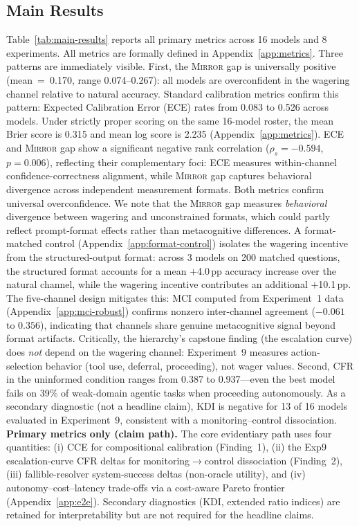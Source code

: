 \documentclass[10pt]{article}
\newcommand{\mirror}{\textsc{Mirror}}
\newcommand{\CCE}{CCE}
\newcommand{\KDI}{KDI}
\newcommand{\CFR}{CFR}
\begin{document}
\subsection{Main Results}

Table~\ref{tab:main-results} reports all primary metrics across 16 models and 8
experiments. All metrics are formally defined in Appendix~\ref{app:metrics}. Three patterns are immediately visible. First, the \mirror{} gap is
universally positive (mean~=~0.170, range 0.074--0.267): all models are
overconfident in the wagering channel relative to natural accuracy.
Standard calibration metrics confirm this pattern: Expected Calibration Error (ECE)
rates from 0.083 to 0.526 across models. Under strictly proper scoring on the
same 16-model roster, the mean Brier score is 0.315 and mean log score is 2.235
(Appendix~\ref{app:metrics}). ECE and \mirror{} gap show a significant negative
rank correlation ($\rho_s = -0.594$, $p = 0.006$), reflecting their
complementary foci: ECE measures within-channel confidence-correctness alignment,
while \mirror{} gap captures behavioral divergence across independent measurement
formats. Both metrics confirm universal overconfidence.
We note that the \mirror{} gap measures \emph{behavioral} divergence between
wagering and unconstrained formats, which could partly reflect prompt-format
effects rather than metacognitive differences. A format-matched control (Appendix~\ref{app:format-control}) isolates the wagering incentive from the structured-output format: across 3 models on 200 matched questions, the structured format accounts for a mean $+$4.0\,pp accuracy increase over the natural channel, while the wagering incentive contributes an additional $+$10.1\,pp. The five-channel design mitigates
this: MCI computed from Experiment~1 data (Appendix~\ref{app:mci-robust}) confirms
nonzero inter-channel agreement ($-0.061$ to $0.356$), indicating that channels
share genuine metacognitive signal beyond format artifacts. Critically, the
hierarchy's capstone finding (the escalation curve) does \emph{not} depend on the
wagering channel: Experiment~9 measures action-selection behavior (tool use,
deferral, proceeding), not wager values. Second, \CFR{}
in the uninformed condition ranges from 0.387 to 0.937---even the best model fails
on 39\% of weak-domain agentic tasks when proceeding autonomously. As a
secondary diagnostic (not a headline claim), \KDI{} is negative for 13 of 16
models evaluated in Experiment~9, consistent with a monitoring--control
dissociation.
\textbf{Primary metrics only (claim path).} The core evidentiary path uses four quantities: (i) \CCE{} for compositional calibration (Finding~1), (ii) the Exp9 escalation-curve \CFR{} deltas for monitoring$\rightarrow$control dissociation (Finding~2), (iii) fallible-resolver system-success deltas (non-oracle utility), and (iv) autonomy--cost--latency trade-offs via a cost-aware Pareto frontier (Appendix~\ref{app:e2e}). Secondary diagnostics (\KDI{}, extended ratio indices) are retained for interpretability but are not required for the headline claims.
\end{document}

